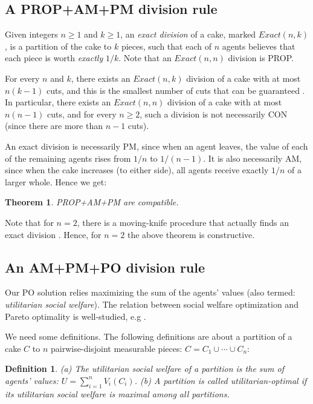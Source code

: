 \documentclass[a4paper,12pt]{article}
\newtheorem{thm}{Theorem}[section]
\newtheorem{defn}{Definition}[section]
\begin{document}
\subsection{A PROP+AM+PM division rule}
Given integers $n\geq 1$ and $k\geq 1$, an \textit{exact division} of a cake, marked $Exact(n,k)$, is a partition of the cake to $k$ pieces, such that each of $n$ agents believes that each piece is worth \emph{exactly} $1/k$. Note that an $Exact(n,n)$ division is PROP.

For every $n$ and $k$, there exists an $Exact(n,k)$ division of a cake with at most $n(k-1)$ cuts, and this is the smallest number of cuts that can be guaranteed \cite{Alon_1987}. In particular, there exists an $Exact(n,n)$ division of a cake with at most $n(n-1)$ cuts, and for every $n\geq 2$, such a division is not necessarily CON (since there are more than $n-1$ cuts).

An exact division is necessarily PM, since when an agent leaves, the value of each of the remaining agents rises from $1/n$ to $1/(n-1)$. It is also necessarily AM, since when the cake increases (to either side), all agents receive exactly $1/n$ of a larger whole. Hence we get:

\begin{thm}
PROP+AM+PM  are compatible.
\end{thm}

Note that for $n=2$, there is a moving-knife procedure that actually finds an exact division \cite{Austin_1982}. Hence, for $n=2$ the above theorem is constructive.



\subsection{An AM+PM+PO division rule}
Our PO solution relies maximizing the sum of the agents' values (also termed: \emph{utilitarian social welfare}). The relation between social welfare optimization and Pareto optimality is well-studied, e.g \cite{Varian_1976}.

We need some definitions. The following definitions are about a partition of a cake $C$ to $n$ pairwise-disjoint measurable pieces: $C = C_1\cup\cdots\cup C_n$:

\begin{defn}
(a) The \emph{utilitarian social welfare} of a partition is the sum of agents' values: $U = \sum_{i=1}^n{V_i(C_i)}$.
(b) A partition is called \emph{utilitarian-optimal} if its utilitarian social welfare is maximal among all partitions.
\end{defn}
\end{document}
